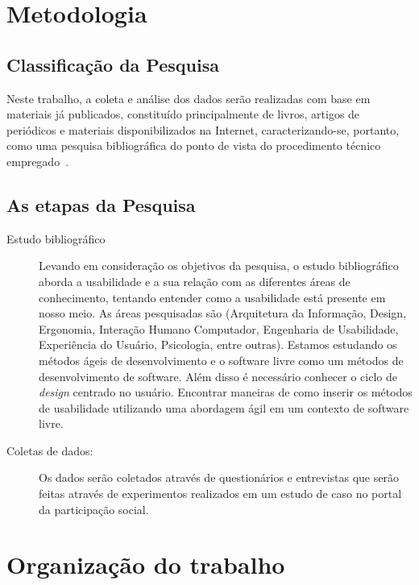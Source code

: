 \section{Metodologia}

\subsection{Classificação da Pesquisa}

Neste trabalho, a coleta e análise dos dados serão realizadas com base em  materiais já publicados, constituído principalmente de livros, artigos de periódicos e  materiais disponibilizados na Internet, caracterizando-se, portanto, como uma pesquisa bibliográfica do ponto de vista do procedimento técnico empregado~\cite{gil1991}.


\subsection{As etapas da Pesquisa}

\begin{description}
\item[Estudo bibliográfico]
%
Levando em consideração os objetivos da pesquisa, o estudo bibliográfico aborda a usabilidade e a sua relação com as diferentes áreas de conhecimento, tentando entender como a usabilidade está presente em nosso meio. As áreas pesquisadas são (Arquitetura da Informação, Design, Ergonomia, Interação Humano Computador, Engenharia de Usabilidade, Experiência do Usuário, Psicologia, entre outras).
%
Estamos estudando os métodos ágeis de desenvolvimento e o software livre como um métodos de desenvolvimento de software.
%
Além disso é necessário conhecer o ciclo de \emph{design} centrado no usuário. Encontrar maneiras de como inserir os métodos de usabilidade utilizando uma abordagem ágil em um contexto de software livre. 

\item[Coletas de dados:]
%
Os dados serão coletados através de questionários e entrevistas que serão feitas através de experimentos realizados em um estudo de caso no portal da participação social.

\end{description}

\section{Organização do trabalho}


